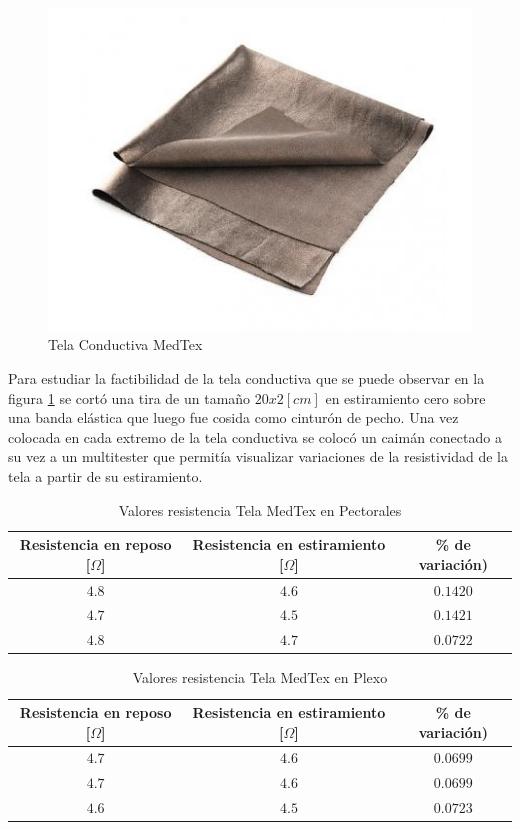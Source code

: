 \begin{figure}[H]
	\centering
	\includegraphics[scale=0.5]{figuras/tela/medtex.jpg}
	\caption{Tela Conductiva MedTex}
	\label{medtex}
\end{figure}

Para estudiar la factibilidad de la tela conductiva que se puede observar en la figura \ref{medtex} se cortó una tira de un tamaño $20x2 [cm]$ en estiramiento cero sobre una banda elástica que luego fue cosida como cinturón de pecho. Una vez colocada en cada extremo de la tela conductiva se colocó un caimán conectado a su vez a un multitester que permitía visualizar variaciones de la resistividad de la tela a partir de su estiramiento. 

\newpage
\begin{table}[H]
	\centering
	\begin{tabular}{| c | c | c |}
		\hline
		\multicolumn{1}{|c|}{\textbf{Resistencia en reposo [$\Omega$]}}&
		\multicolumn{1}{c|}{\textbf{Resistencia en estiramiento [$\Omega$]}}&
		\multicolumn{1}{|c|}{\textbf{\% de variación)}}\\ \hline
		$4.8$  & $4.6$  & $0.1420$  \\ \hline
		$4.7$  & $4.5$ & $0.1421$ \\ \hline
		$4.8$ & $4.7$  & $0.0722$  \\ \hline
	\end{tabular}
	\caption{Valores resistencia Tela MedTex en Pectorales}
	\label{tablatex1}
\end{table}

\begin{table}[H]
	\centering
	\begin{tabular}{| c | c | c |}
		\hline
		\multicolumn{1}{|c|}{\textbf{Resistencia en reposo [$\Omega$]}}&
		\multicolumn{1}{c|}{\textbf{Resistencia en estiramiento [$\Omega$]}}&
		\multicolumn{1}{|c|}{\textbf{\% de variación)}}\\ \hline
		$4.7$  & $4.6$  & $0.0699$  \\ \hline
		$4.7$  & $4.6$ & $0.0699$ \\ \hline
		$4.6$ & $4.5$  & $0.0723$  \\ \hline
	\end{tabular}
	\caption{Valores resistencia Tela MedTex en Plexo}
	\label{tablatex2}
\end{table}

